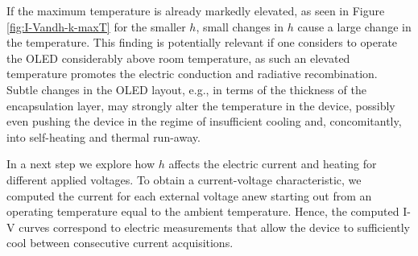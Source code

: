 \documentclass[%
9pt,
 aip,
rsi,%
 amsmath,amssymb,
preprint,%
]{revtex4-1}
\begin{document}
If the maximum temperature is already markedly elevated, as seen in Figure \ref{fig:I-Vandh-k-maxT} for the smaller $h$, small changes in $h$ cause a large change in the temperature.
This finding is potentially relevant if one considers to operate the OLED considerably above room temperature, as such an elevated temperature promotes the electric conduction and radiative recombination. Subtle changes in the OLED layout, e.g., in terms of the thickness of the encapsulation layer, may strongly alter the temperature in the device, possibly even pushing the device in the regime of insufficient cooling and, concomitantly, into self-heating and thermal run-away.


In a next step we explore how $h$ affects the electric current and heating for different applied voltages.
To obtain a current-voltage characteristic, we computed the current for each external voltage anew starting out from an operating temperature equal to the ambient temperature. Hence, the computed I-V curves correspond to electric measurements that allow the device to sufficiently cool between consecutive current acquisitions.
\end{document}
